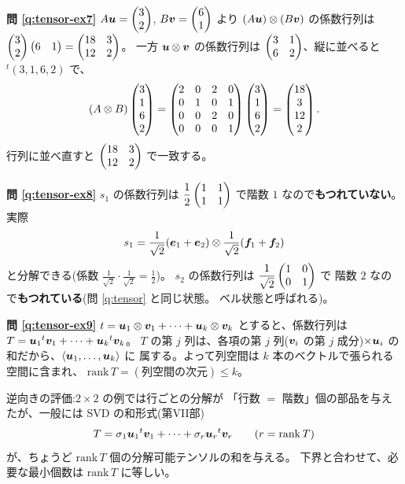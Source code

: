 \bigskip
\noindent\textbf{問 \ref{q:tensor-ex7}}\quad
$A\bm{u} = \begin{pmatrix}3 \\ 2\end{pmatrix}$, $B\bm{v} = \begin{pmatrix}6 \\ 1\end{pmatrix}$ より
$(A\bm{u}) \otimes (B\bm{v})$ の係数行列は
$\begin{pmatrix}3 \\ 2\end{pmatrix}\begin{pmatrix}6 & 1\end{pmatrix} = \begin{pmatrix}18 & 3 \\ 12 & 2\end{pmatrix}$。
一方 $\bm{u} \otimes \bm{v}$ の係数行列は
$\begin{pmatrix}3 & 1 \\ 6 & 2\end{pmatrix}$、縦に並べると ${}^t(3, 1, 6, 2)$ で、
\[
(A \otimes B)\begin{pmatrix}3 \\ 1 \\ 6 \\ 2\end{pmatrix}
= \begin{pmatrix}2 & 0 & 2 & 0 \\ 0 & 1 & 0 & 1 \\
0 & 0 & 2 & 0 \\ 0 & 0 & 0 & 1\end{pmatrix}\begin{pmatrix}3 \\ 1 \\ 6 \\ 2\end{pmatrix}
= \begin{pmatrix}18 \\ 3 \\ 12 \\ 2\end{pmatrix}.
\]
行列に並べ直すと $\begin{pmatrix}18 & 3 \\ 12 & 2\end{pmatrix}$ で一致する。

\bigskip
\noindent\textbf{問 \ref{q:tensor-ex8}}\quad
$s_1$ の係数行列は $\dfrac{1}{2}\begin{pmatrix}1 & 1 \\ 1 & 1\end{pmatrix}$ で階数 $1$
なので\textbf{もつれていない}。実際
\[
s_1 = \frac{1}{\sqrt{2}}(\bm{e}_1 + \bm{e}_2) \otimes
\frac{1}{\sqrt{2}}(\bm{f}_1 + \bm{f}_2)
\]
と分解できる(係数 $\frac{1}{\sqrt{2}} \cdot \frac{1}{\sqrt{2}}
= \frac{1}{2}$)。
$s_2$ の係数行列は $\dfrac{1}{\sqrt{2}}\begin{pmatrix}1 & 0 \\ 0 & 1\end{pmatrix}$ で
階数 $2$ なので\textbf{もつれている}(問 \ref{q:tensor} と同じ状態。
ベル状態と呼ばれる)。

\bigskip
\noindent\textbf{問 \ref{q:tensor-ex9}}\quad
$t = \bm{u}_1 \otimes \bm{v}_1 + \cdots + \bm{u}_k \otimes \bm{v}_k$
とすると、係数行列は
$T = \bm{u}_1{}^t\bm{v}_1 + \cdots + \bm{u}_k{}^t\bm{v}_k$。
$T$ の第 $j$ 列は、各項の第 $j$ 列($\bm{v}_i$ の第 $j$ 成分)$\times
\bm{u}_i$ の和だから、$\langle \bm{u}_1, \dots, \bm{u}_k \rangle$ に
属する。よって列空間は $k$ 本のベクトルで張られる空間に含まれ、
$\mathrm{rank}\,T = (\text{列空間の次元}) \le k$。

逆向きの評価:$2 \times 2$ の例では行ごとの分解が
「行数 $=$ 階数」個の部品を与えたが、一般には SVD の和形式(第VII部)
\[
T = \sigma_1\bm{u}_1{}^t\bm{v}_1 + \cdots
+ \sigma_r\bm{u}_r{}^t\bm{v}_r \qquad (r = \mathrm{rank}\,T)
\]
が、ちょうど $\mathrm{rank}\,T$ 個の分解可能テンソルの和を与える。
下界と合わせて、必要な最小個数は $\mathrm{rank}\,T$ に等しい。

